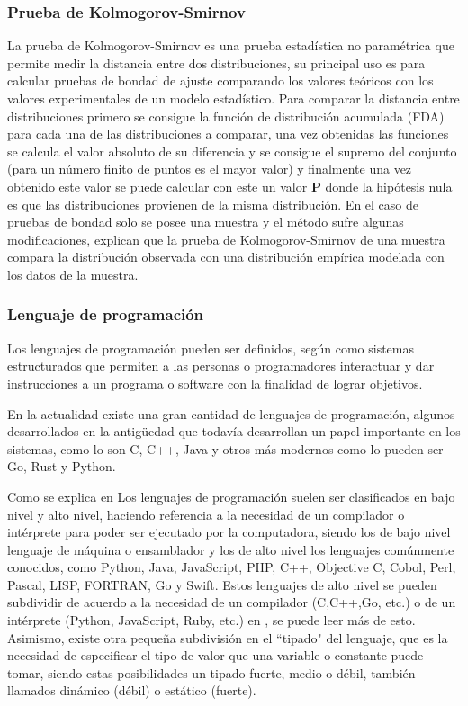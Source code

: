 \subsubsection{Prueba de Kolmogorov-Smirnov}
La prueba de Kolmogorov-Smirnov es una prueba estadística no paramétrica que
permite medir la distancia entre dos distribuciones, su principal uso es para
calcular pruebas de bondad de ajuste comparando los valores teóricos con los
valores experimentales de un modelo estadístico. Para comparar la distancia
entre distribuciones primero se consigue la función de distribución acumulada
(FDA) para cada una de las distribuciones a comparar, una vez obtenidas las
funciones se calcula el valor absoluto de su diferencia y se consigue el
supremo del conjunto (para un número finito de puntos es el mayor valor) y
finalmente una vez obtenido este valor se puede calcular con este un valor \textbf{P}
donde la hipótesis nula es que las distribuciones provienen de la misma
distribución. En el caso de pruebas de bondad solo se posee una muestra y el
método sufre algunas modificaciones, \textcite{GregoryW} explican que la prueba de
Kolmogorov-Smirnov de una muestra compara la distribución observada con una
distribución empírica modelada con los datos de la muestra.


\subsubsection{Lenguaje de programación}
Los lenguajes de programación pueden ser definidos, según \textcite{ETAC} como
sistemas estructurados
que permiten a las personas o programadores interactuar y dar instrucciones a un
programa o software con la finalidad de lograr objetivos.

En la actualidad existe una gran cantidad de lenguajes de programación, algunos
desarrollados en la antigüedad que todavía desarrollan un papel importante en
los sistemas, como lo son C, C++, Java y otros más modernos como lo pueden ser
Go, Rust y Python.

Como se explica en \textcite{javaTpoint}
Los lenguajes de programación suelen ser clasificados en bajo nivel y alto nivel,
haciendo referencia a la necesidad de un compilador o intérprete para poder ser
ejecutado por la computadora, siendo los de bajo nivel lenguaje de máquina o
ensamblador y los de alto nivel los lenguajes comúnmente conocidos, como
Python, Java, JavaScript, PHP, C++, Objective C, Cobol, Perl, Pascal, LISP,
FORTRAN, Go y Swift. Estos lenguajes de alto nivel se pueden subdividir
de acuerdo a la necesidad de un compilador (C,C++,Go, etc.) o de un intérprete
(Python, JavaScript, Ruby, etc.) en \textcite{LenguajesCompiladosEInterpretados}, se
puede leer más de esto. Asimismo, existe otra pequeña subdivisión en el ``tipado"
del lenguaje, que es la necesidad de especificar el tipo de valor que una
variable o constante puede tomar, siendo estas posibilidades un tipado fuerte,
medio o débil, también llamados dinámico (débil) o estático (fuerte).


